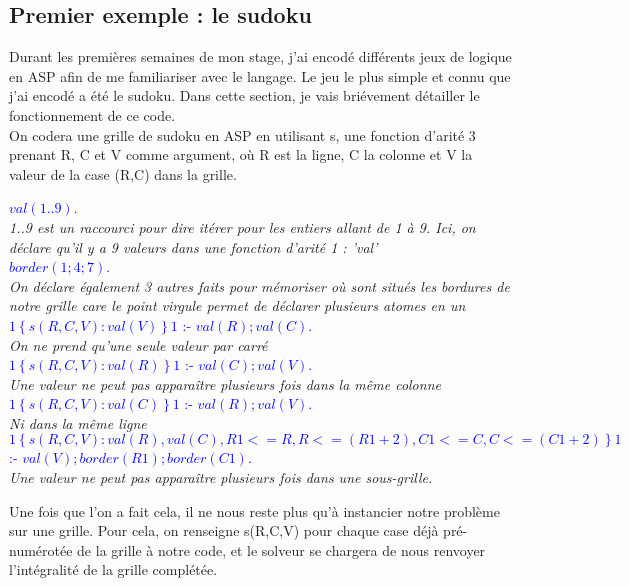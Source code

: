 \documentclass[12pt,a4paper]{article}
\begin{document}
\subsection{Premier exemple : le sudoku}
Durant les premières semaines de mon stage, j'ai encodé différents jeux de logique en ASP afin de me familiariser avec le langage. Le jeu le plus simple et connu que j'ai encodé a été le sudoku. Dans cette section, je vais 
briévement détailler le fonctionnement de ce code.\\
On codera une grille de sudoku en ASP en utilisant s, une fonction d'arité 3 prenant R, C et V comme argument, où R est la ligne, C la colonne et V la valeur de la case (R,C) dans la grille.
\begin{center}
\textcolor{blue}{
	$val(1..9)$.\\
}
\emph{1..9 est un raccourci pour dire itérer pour les entiers allant de 1 à 9. Ici, on déclare qu'il y a 9 valeurs dans une fonction d'arité 1 : 'val'}\\
\textcolor{blue}{
	$border(1;4;7)$.\\
}
\emph{On déclare également 3 autres faits pour mémoriser où sont situés les bordures de notre grille care le point virgule permet de  déclarer plusieurs atomes en un}\\
\textcolor{blue}{
	$1\left\{ s(R,C,V): val(V) \right\}1$ :- $val(R) ; val(C)$.\\
}
\emph{On ne prend qu'une seule valeur par carré}\\
\textcolor{blue}{
	$1\left\{ s(R,C,V): val(R) \right\}1$ :- $val(C) ; val(V)$.\\
}
\emph{Une valeur ne peut pas apparaître plusieurs fois dans la même colonne}\\
\textcolor{blue}{
	$1\left\{ s(R,C,V): val(C) \right\}1$ :- $val(R) ; val(V)$.\\
}
\emph{Ni dans la même ligne}\\
\textcolor{blue}{
	$1\left\{ s(R,C,V): val(R), val(C), R1<=R, R<=(R1+2), C1<=C, C<=(C1+2)\right\}1$ :- $val(V) ; border(R1) ; border(C1)$.\\
}
\emph{Une valeur ne peut pas apparaître plusieurs fois dans une sous-grille.}\\
\end{center}
Une fois que l'on a fait cela, il ne nous reste plus qu'à instancier notre problème sur une grille. Pour cela, on renseigne s(R,C,V) pour chaque case déjà pré-numérotée de la grille à notre code, et le solveur se chargera 
de nous renvoyer l'intégralité de la grille complétée.
\end{document}
